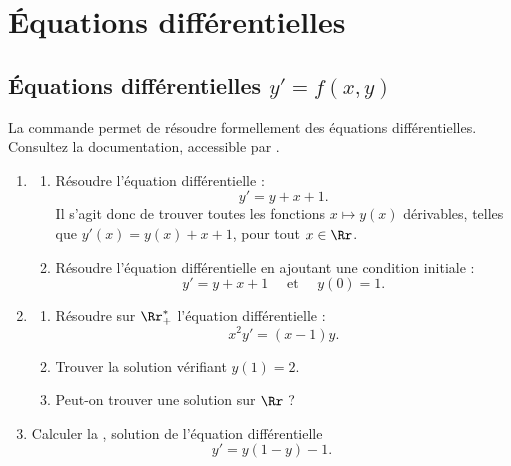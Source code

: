 \documentclass[class=report,crop=false]{standalone}
\begin{document}


\setcounter{section}{8}
\section{\'Equations différentielles}


\subsection{\'Equations différentielles $y' = f(x,y)$}

La commande  permet de résoudre formellement des équations différentielles.
Consultez la documentation, accessible par .

\begin{tp}
\sauteligne
\begin{enumerate}
  \item 
  \begin{enumerate}
    \item Résoudre l'équation différentielle :
  $$y' = y + x + 1.$$
  Il s'agit donc de trouver toutes les fonctions $x\mapsto y(x)$ dérivables, telles que
  $y'(x) = y(x) + x + 1$, pour tout $x\in \Rr$.
    
    \item Résoudre l'équation différentielle en ajoutant une condition initiale :
  $$y' = y + x + 1 \quad \text{ et } \quad y(0)=1.$$
  \end{enumerate}
  
  

  \item 
  \begin{enumerate}
    \item
    Résoudre sur $\Rr_+^*$ l'équation différentielle :
    $$x^2y' = (x-1)y.$$ 
    \item Trouver la solution vérifiant $y(1)=2$.
    
    \item Peut-on trouver une solution sur $\Rr$ ?
  \end{enumerate}
    
  \item Calculer la , solution
  de l'équation différentielle $$y'= y(1-y) - 1.$$       
\end{enumerate}
\end{tp}
\end{document}
